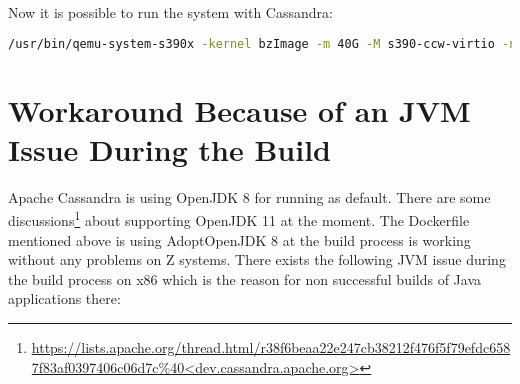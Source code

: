 Now it is possible to run the system with Cassandra: \\
\begin{lstlisting}[language=bash,caption={Run Cassandra},captionpos=b,label={RunCassandra}]
 /usr/bin/qemu-system-s390x -kernel bzImage -m 40G -M s390-ccw-virtio -nodefaults -device sclpconsole,chardev=console -parallel none -net none -chardev stdio,id=console,signal=off,mux=on -mon chardev=console -nographic -smp 3 -hda /data/dockerfile-examples/ApacheCassandra/cassandra.img --append 'root=/dev/vda rw console=ttyS0 rdinit=/bin/bash' 
 \end{lstlisting}
 
\section{Workaround Because of an JVM Issue During the Build}

Apache Cassandra is using OpenJDK 8 for running as default. There are some discussions\footnote{\url{https://lists.apache.org/thread.html/r38f6beaa22e247cb38212f476f5f79efdc6587f83af0397406c06d7c\%40<dev.cassandra.apache.org>}} about supporting OpenJDK 11 at the moment. The Dockerfile mentioned above is using AdoptOpenJDK 8 at the build process is working without any problems on Z systems. There exists the following JVM issue during the build process on x86 which is the reason for non successful builds of Java applications there:

